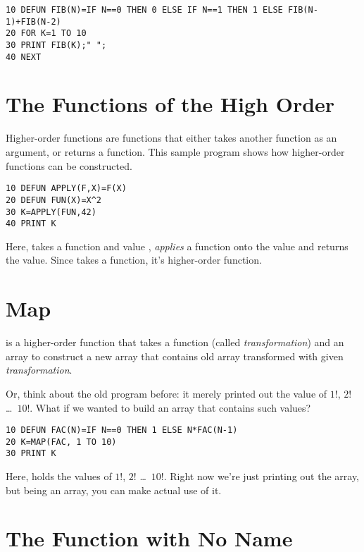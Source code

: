 \begin{lstlisting}
10 DEFUN FIB(N)=IF N==0 THEN 0 ELSE IF N==1 THEN 1 ELSE FIB(N-1)+FIB(N-2)
20 FOR K=1 TO 10
30 PRINT FIB(K);" ";
40 NEXT
\end{lstlisting}

\section[Higher-order Function]{The Functions of the High Order}

Higher-order functions are functions that either takes another function as an argument, or returns a function. This sample program shows how higher-order functions can be constructed.

\begin{lstlisting}
10 DEFUN APPLY(F,X)=F(X)
20 DEFUN FUN(X)=X^2
30 K=APPLY(FUN,42)
40 PRINT K
\end{lstlisting}

Here,  takes a function  and value , \emph{applies} a function  onto the value  and returns the value. Since  takes a function, it's higher-order function.

\section[MAPping]{Map}

 is a higher-order function that takes a function (called \emph{transformation}) and an array to construct a new array that contains old array transformed with given \emph{transformation}.

Or, think about the old  program before: it merely printed out the value of $1!$, $2!$ \ldots\ $10!$. What if we wanted to build an array that contains such values?

\begin{lstlisting}
10 DEFUN FAC(N)=IF N==0 THEN 1 ELSE N*FAC(N-1)
20 K=MAP(FAC, 1 TO 10)
30 PRINT K
\end{lstlisting}

Here,  holds the values of $1!$, $2!$ \ldots\ $10!$. Right now we're just printing out the array, but being an array, you can make actual use of it.

\section[Closure]{The Function with No Name}

